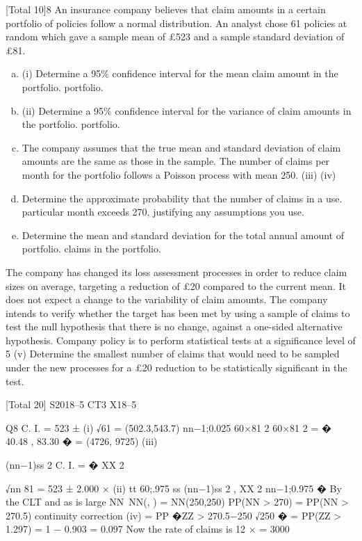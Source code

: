 \documentclass[a4paper,12pt]{article}
\begin{document}
[Total 10]8
An insurance company believes that claim amounts in a certain portfolio of policies
follow a normal distribution. An analyst chose 61 policies at random which gave a
sample mean of £523 and a sample standard deviation of £81.

\begin{enumerate}[(a)]
\item (i) Determine a 95\% confidence interval for the mean claim amount in the
portfolio.
portfolio.
\item 
(ii) Determine a 95\% confidence interval for the variance of claim amounts in the
portfolio.
portfolio.
\item 
The company assumes that the true mean and standard deviation of claim amounts are
the same as those in the sample.
The number of claims per month for the portfolio follows a Poisson process with
mean 250.
(iii)
(iv)
\item 
Determine the approximate probability that the number of claims in a
use.
particular month exceeds 270, justifying any assumptions you use.
\item 
Determine the mean and standard deviation for the total annual amount of
portfolio.
claims in the portfolio.
\end{enumerate}
The company has changed its loss assessment processes in order to reduce claim sizes
on average, targeting a reduction of £20 compared to the current mean. It does not
expect a change to the variability of claim amounts. The company intends to verify
whether the target has been met by using a sample of claims to test the null hypothesis
that there is no change, against a one-sided alternative hypothesis. Company policy is
to perform statistical tests at a significance level of 5%
(v)
Determine the smallest number of claims that would need to be sampled under
the new processes for a £20 reduction to be statistically significant in the test.



[Total 20]
S2018–5 
CT3 X18–5

Q8
C. I. = 523 ±
(i)
√61
= (502.3,543.7)
nn−1;0.025
60×81 2 60×81 2
= � 40.48 , 83.30 �
= (4726, 9725)
(iii)


(nn−1)ss 2
C. I. = � ΧΧ 2

√nn
81
= 523 ± 2.000 ×
(ii)
tt 60;.975 ss
(nn−1)ss 2
, ΧΧ 2
nn−1;0.975
�
By the CLT and as \lambda\lambda is large NN~NN(\lambda\lambda, \lambda\lambda) = NN(250,250)
PP(NN > 270) = PP(NN > 270.5) continuity correction
(iv)
= PP �ZZ >
270.5−250
√250
� = PP(ZZ > 1.297) = 1 − 0.903 = 0.097
Now the rate of claims is 12 × \lambda\lambda = 3000
\end{document}
